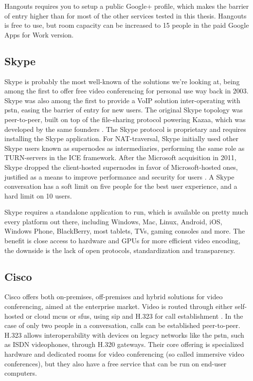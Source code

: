 Hangouts requires you to setup a public Google+ profile, which makes the barrier of entry higher than for most of the other services tested in this thesis. Hangouts is free to use, but room capacity can be increased to 15 people in the paid Google Apps for Work version.


\subsection{Skype}

Skype is probably the most well-known of the solutions we're looking at, being among the first to offer free video conferencing for personal use way back in 2003. Skype was also among the first to provide a VoIP solution inter-operating with \gls{pstn}, easing the barrier of entry for new users. The original Skype topology was peer-to-peer, built on top of the file-sharing protocol powering Kazaa, which was developed by the same founders \cite{skype-history}.  The Skype protocol is proprietary and requires installing the Skype application. For NAT-traversal, Skype initially used other Skype users known as supernodes as intermediaries, performing the same role as TURN-servers in the ICE framework. After the Microsoft acquisition in 2011, Skype dropped the client-hosted supernodes in favor of Microsoft-hosted ones, justified as a means to improve performance and security for users \cite{skype-topo-change}. A Skype conversation has a soft limit on five people for the best user experience, and a hard limit on 10 users.

Skype requires a standalone application to run, which is available on pretty much every platform out there, including Windows, Mac, Linux, Android, iOS, Windows Phone, BlackBerry, most tablets, TVs, gaming consoles and more. The benefit is close access to hardware and GPUs for more efficient video encoding, the downside is the lack of open protocols, standardization and transparency.


\subsection{Cisco}

Cisco offers both on-premises, off-premises and hybrid solutions for video conferencing, aimed at the enterprise market. Video is routed through either self-hosted or cloud \glspl{mcu} or \glspl{sfu}, using \gls{sip} and H.323 for call establishment \cite{cisco-arch}. In the case of only two people in a conversation, calls can be established peer-to-peer. H.323 allows interoperability with devices on legacy networks like the \gls{pstn}, such as ISDN videophones, through H.320 gateways. Their core offering is specialized hardware and dedicated rooms for video conferencing (so called immersive video conferences), but they also have a free service that can be run on end-user computers.


